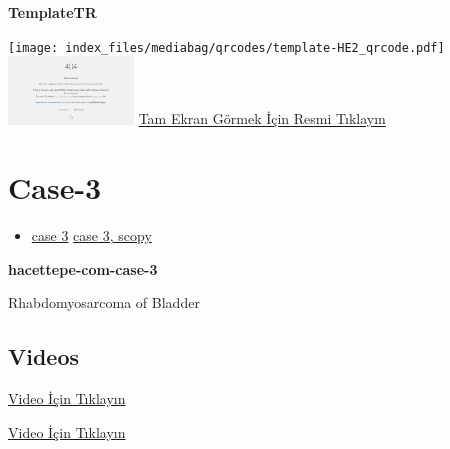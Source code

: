 \documentclass[
  letterpaper,
  DIV=11,
  numbers=noendperiod]{scrreprt}
\providecommand{\tightlist}{%
  \setlength{\itemsep}{0pt}\setlength{\parskip}{0pt}}\usepackage{longtable,booktabs,array}
\begin{document}
\textbf{TemplateTR}

\texttt{[image: index\_files/mediabag/qrcodes/template-HE2\_qrcode.pdf]}
\href{https://images.patolojiatlasi.com/template/HE2.html}{\includegraphics[width=0.25\textwidth,height=\textheight]{./screenshots/thumbnail_template-HE2.png}}
\href{https://images.patolojiatlasi.com/template/HE2.html}{Tam Ekran
Görmek İçin Resmi Tıklayın}

\hypertarget{sec-hacettepe-case-of-the-month-case-3}{%
\section{Case-3}\label{sec-hacettepe-case-of-the-month-case-3}}

\begin{itemize}
\tightlist
\item
  \href{https://www.youtube.com/watch?v=JGDsmznBqZM&ab_channel=KemalKosemehmetoglu}{case
  3}
  \href{https://www.youtube.com/watch?v=yKnEyGE4oD4&ab_channel=KemalKosemehmetoglu}{case
  3, scopy}
\end{itemize}

\textbf{hacettepe-com-case-3}

\begin{tcolorbox}[enhanced jigsaw, breakable, opacitybacktitle=0.6, arc=.35mm, colbacktitle=quarto-callout-tip-color!10!white, colback=white, toptitle=1mm, left=2mm, opacityback=0, colframe=quarto-callout-tip-color-frame, titlerule=0mm, rightrule=.15mm, bottomrule=.15mm, toprule=.15mm, bottomtitle=1mm, title=\textcolor{quarto-callout-tip-color}{\faLightbulb}\hspace{0.5em}{Tanı}, coltitle=black, leftrule=.75mm]

Rhabdomyosarcoma of Bladder

\end{tcolorbox}

\hypertarget{videos}{%
\subsection{Videos}\label{videos}}

\href{https://www.youtube.com/watch?v=JGDsmznBqZM}{Video İçin Tıklayın}

\href{https://www.youtube.com/watch?v=yKnEyGE4oD4}{Video İçin Tıklayın}
\end{document}
